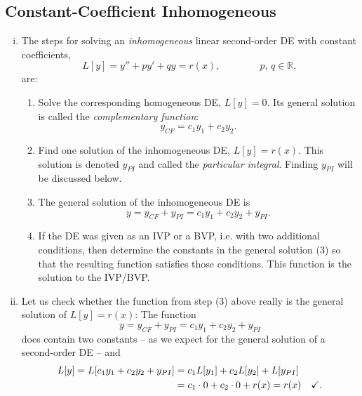 \subsection{Constant-Coefficient Inhomogeneous}

\begin{remark}
\begin{enumerate}[(i)]
	\item The steps for solving an \emph{inhomogeneous} linear second-order DE with constant coefficients, 
	\[ L[y] = y''+py'+qy = r(x), \qquad \qquad p,\,q\in\mathbb{R},\]
	are:
	\begin{enumerate}[(1)]
		\item Solve the corresponding homogeneous DE, $L[y] = 0$. Its general solution is called the \emph{complementary function}:
		\[ y_{CF} = c_1y_1+c_2y_2. \]
		\item Find one solution of the inhomogeneous DE, $L[y]=r(x)$. This solution is denoted $y_{PI}$ and called the \emph{particular integral}. Finding $y_{PI}$ will be discussed below.
		\item The general solution of the inhomogeneous DE is
		\[ y = y_{CF} + y_{PI} = c_1y_1+c_2y_2 + y_{PI}. \]
		\item If the DE was given as an IVP or a BVP, i.e. with two additional conditions, then determine the constants in the general solution (3) so that the resulting function satisfies those conditions. This function is the solution to the IVP/BVP.
	\end{enumerate}
	\item Let us check whether the function from step (3) above really is the general solution of $L[y]=r(x)$: The function
	\[ y = y_{CF} + y_{PI} = c_1y_1+c_2y_2 + y_{PI} \]
	does contain two constants -- as we expect for the general solution of a second-order DE -- and
	\begin{equation*}
	\begin{split}
	L[y] = L[c_1y_1+c_2y_2 + y_{PI}] &= c_1L[y_1] + c_2L[y_2]+L[y_{PI}] \\ 
	&= c_1 \cdot 0 + c_2 \cdot 0 + r(x) = r(x) \quad \text{\checkmark}.
	\end{split}
	\end{equation*}
\end{enumerate}
\end{remark}

